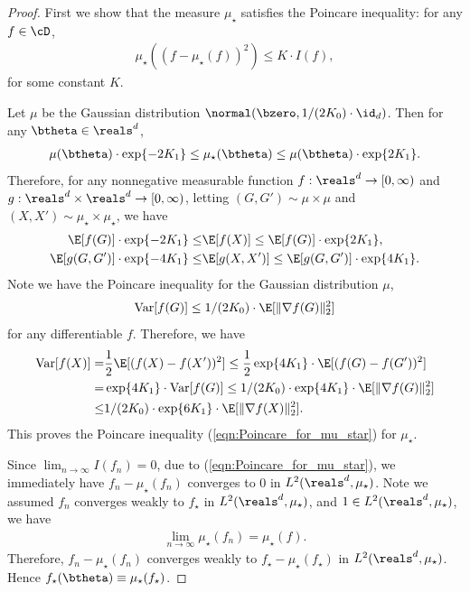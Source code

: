 \documentclass[11pt]{article}
\begin{document}
\begin{proof}


First we show that the measure $\mu_\star$ satisfies the Poincare inequality:  for any $f \in \cD$,
\begin{align}\label{eqn:Poincare_for_mu_star}
\mu_\star((f - \mu_\star(f))^2) \le K \cdot I(f),
\end{align}
for some constant $K$. 

Let $\mu$ be the Gaussian distribution $\normal(\bzero, 1/(2 K_0) \cdot \id_d)$. Then for any $\btheta \in \reals^d$,
\begin{align}
\mu(\btheta) \cdot \exp\{ - 2 K_1 \} \le \mu_\star(\btheta) \le \mu(\btheta) \cdot \exp\{2 K_1 \}. 
\end{align}
Therefore, for any nonnegative measurable function $f : \reals^d \to [0, \infty)$ and $g: \reals^d \times \reals^d \to [0, \infty)$, letting $(G, G') \sim \mu \times \mu$ and $(X, X') \sim \mu_\star \times \mu_\star$, we have 
\[
\begin{aligned}
\E[f(G)] \cdot \exp\{ -2 K_1 \} \le& \E[f(X)] \le \E[f(G)] \cdot \exp\{ 2 K_1 \},\\
\E[g(G, G')] \cdot \exp\{ -4 K_1 \} \le& \E[g(X, X')] \le \E[g(G, G')] \cdot \exp\{ 4 K_1 \}.
\end{aligned}
\]
Note we have the Poincare inequality for the Gaussian distribution $\mu$, 
\begin{align}
\text{Var}[f(G)] \le 1/(2 K_0) \cdot \E[\| \nabla f(G) \|_2^2]
\end{align}
for any differentiable $f$. Therefore, we have 
\[
\begin{aligned}
\text{Var}[f(X)] =& \frac{1}{2}\E[(f(X) - f(X'))^2] \le \frac{1}{2}\exp\{ 4 K_1 \} \cdot \E[(f(G) - f(G'))^2]\\
=& \exp\{ 4 K_1 \} \cdot \text{Var}[f(G)] \le 1/(2K_0) \cdot \exp\{ 4 K_1 \} \cdot \E[\| \nabla f(G) \|_2^2] \\
\le& 1/(2K_0) \cdot \exp\{ 6 K_1 \} \cdot \E[\| \nabla f(X) \|_2^2]. 
\end{aligned}
\]
This proves the Poincare inequality (\ref{eqn:Poincare_for_mu_star}) for $\mu_\star$.

Since $\lim_{n\to \infty} I(f_n) = 0$, due to (\ref{eqn:Poincare_for_mu_star}), we immediately have $f_n - \mu_\star(f_n)$ converges to $0$ in $L^2(\reals^d, \mu_\star)$. Note we assumed $f_n$ converges weakly to $f_\star$ in $L^2(\reals^d, \mu_\star)$, and $1 \in L^2(\reals^d, \mu_\star)$, we have 
\[
\begin{aligned}
\lim_{n \to \infty} \mu_\star(f_n) =  \mu_\star(f). 
\end{aligned}
\]
Therefore, $f_n - \mu_\star(f_n)$ converges weakly to $f_\star - \mu_\star(f_\star)$ in $L^2(\reals^d, \mu_\star)$. Hence $f_\star(\btheta) \equiv  \mu_\star(f_\star)$.


\end{proof}
\end{document}
